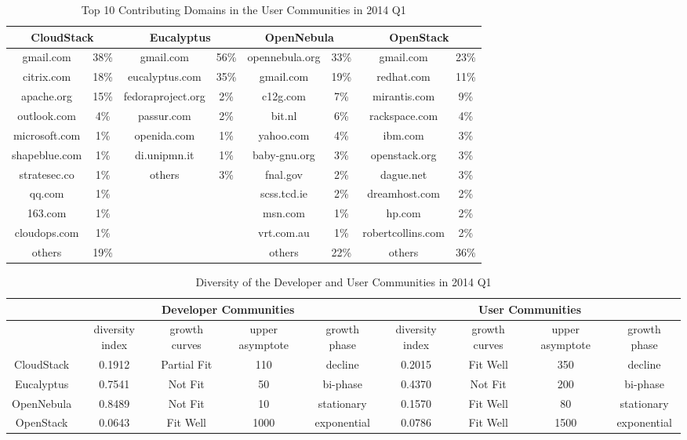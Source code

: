 \documentclass[conference]{IEEEtran}
\begin{document}
\begin{table}[t!]
\caption{Top 10 Contributing Domains in the User Communities in 2014 Q1}
\label{tbl:user}
\centering
\begin{tabular}{|c|c|c|c|c|c|c|c|} \hline
    \multicolumn{2}{|c|}{CloudStack} &
    \multicolumn{2}{|c|}{Eucalyptus} &
    \multicolumn{2}{|c|}{OpenNebula} &
    \multicolumn{2}{|c|}{OpenStack} \\ \hline
    gmail.com & 38\% & gmail.com & 56\% & opennebula.org & 33\% & gmail.com & 23\% \\ \hline
    citrix.com & 18\% & eucalyptus.com & 35\% & gmail.com & 19\% & redhat.com & 11\% \\ \hline
	apache.org & 15\% & fedoraproject.org & 2\% & c12g.com& 7\% & mirantis.com & 9\% \\ \hline
	outlook.com & 4\% & passur.com & 2\% & bit.nl & 6\% & rackspace.com & 4\% \\ \hline
	microsoft.com & 1\% & openida.com & 1\% & yahoo.com & 4\% & ibm.com & 3\% \\ \hline
	shapeblue.com & 1\% &di.unipmn.it & 1\% & baby-gnu.org& 3\% & openstack.org & 3\% \\ \hline
	stratesec.co & 1\% & others & 3\% & fnal.gov& 2\% & dague.net & 3\% \\ \hline
	qq.com & 1\% & & & scss.tcd.ie& 2\% & dreamhost.com & 2\% \\ \hline
	163.com & 1\% & & & msn.com& 1\% & hp.com & 2\% \\ \hline
	cloudops.com & 1\% & & & vrt.com.au& 1\% & robertcollins.com & 2\% \\ \hline
	others & 19\% & & & others & 22\% & others &36\% \\ \hline
\end{tabular}
\end{table}


\begin{table}[t!]
\caption{Diversity of the Developer and User Communities in 2014 Q1}
\label{tbl:diversity}
\centering
\begin{tabular}{|c|c|c|c|c|c|c|c|c|} \hline
    \multicolumn{1}{|c|}{} &
    \multicolumn{4}{|c|}{Developer Communities} &
    \multicolumn{4}{|c|}{User Communities} \\ \hline
	  & diversity index & growth curves & upper asymptote & growth phase & diversity index & growth curves & upper asymptote & growth phase \\ \hline
	 CloudStack & 0.1912 & Partial Fit & 110 & decline & 0.2015 & Fit Well & 350 & decline \\ \hline
	 Eucalyptus & 0.7541 & Not Fit & 50 & bi-phase & 0.4370 & Not Fit & 200 & bi-phase \\ \hline
	 OpenNebula & 0.8489 & Not Fit & 10 & stationary & 0.1570 & Fit Well & 80 & stationary \\ \hline
	 OpenStack  & 0.0643 & Fit Well & 1000 & exponential & 0.0786 & Fit Well & 1500 & exponential \\ \hline
\end{tabular}
\end{table}
\end{document}
